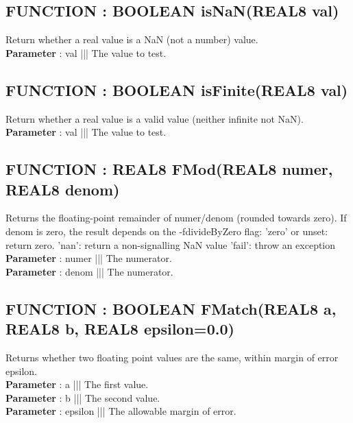 \subsection*{FUNCTION : BOOLEAN isNaN(REAL8 val)}
\hypertarget{ecldoc:Math_math.isnan}{}
Return whether a real value is a NaN (not a number) value. \\
\textbf{Parameter} : val ||| The value to test. \\
\subsection*{FUNCTION : BOOLEAN isFinite(REAL8 val)}
\hypertarget{ecldoc:Math_math.isfinite}{}
Return whether a real value is a valid value (neither infinite not NaN). \\
\textbf{Parameter} : val ||| The value to test. \\
\subsection*{FUNCTION : REAL8 FMod(REAL8 numer, REAL8 denom)}
\hypertarget{ecldoc:Math_math.fmod}{}
Returns the floating-point remainder of numer/denom (rounded towards zero). If denom is zero, the result depends on the -fdivideByZero flag: 'zero' or unset: return zero. 'nan': return a non-signalling NaN value 'fail': throw an exception \\
\textbf{Parameter} : numer ||| The numerator. \\
\textbf{Parameter} : denom ||| The numerator. \\
\subsection*{FUNCTION : BOOLEAN FMatch(REAL8 a, REAL8 b, REAL8 epsilon=0.0)}
\hypertarget{ecldoc:Math_math.fmatch}{}
Returns whether two floating point values are the same, within margin of error epsilon. \\
\textbf{Parameter} : a ||| The first value. \\
\textbf{Parameter} : b ||| The second value. \\
\textbf{Parameter} : epsilon ||| The allowable margin of error. \\

